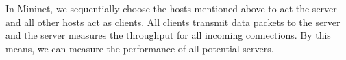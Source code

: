 In Mininet, we sequentially choose the hosts mentioned above 
to act the server and all other hosts act as clients. All clients transmit
data packets to the server and the server measures the throughput for all 
incoming connections. By this means, we can measure the performance of 
all potential servers. 